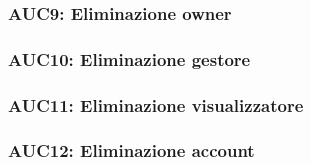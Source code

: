 \documentclass[../analisi-dei-requisiti.tex]{subfiles}
\begin{document}


\subsubsection{AUC9: Eliminazione owner}%
\label{subs:AUC9}



\subsubsection{AUC10: Eliminazione gestore}%
\label{subs:AUC10}



\subsubsection{AUC11: Eliminazione visualizzatore}%
\label{subs:AUC11}



\subsubsection{AUC12: Eliminazione account}%
\label{subs:AUC12}


\end{document}

